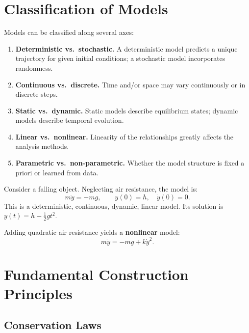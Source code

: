 \section{Classification of Models}
\label{sec:classification}

\begin{definition}
Models can be classified along several axes:
\begin{enumerate}
  \item \textbf{Deterministic vs.\ stochastic.}
    A deterministic model predicts a unique trajectory for given initial
    conditions; a stochastic model incorporates randomness.
  \item \textbf{Continuous vs.\ discrete.}
    Time and/or space may vary continuously or in discrete steps.
  \item \textbf{Static vs.\ dynamic.}
    Static models describe equilibrium states; dynamic models describe
    temporal evolution.
  \item \textbf{Linear vs.\ nonlinear.}
    Linearity of the relationships greatly affects the analysis methods.
  \item \textbf{Parametric vs.\ non-parametric.}
    Whether the model structure is fixed a priori or learned from data.
\end{enumerate}
\end{definition}

\begin{example}
Consider a falling object.  Neglecting air resistance, the model is:
\[
  m\ddot{y} = -mg, \qquad y(0)=h,\quad \dot{y}(0)=0.
\]
This is a deterministic, continuous, dynamic, linear model.
Its solution is $y(t)=h-\tfrac{1}{2}gt^2$.

Adding quadratic air resistance yields a \textbf{nonlinear} model:
\[
  m\ddot{y} = -mg + k\dot{y}^2.
\]
\end{example}

\section{Fundamental Construction Principles}
\label{sec:principles}

\subsection{Conservation Laws}

